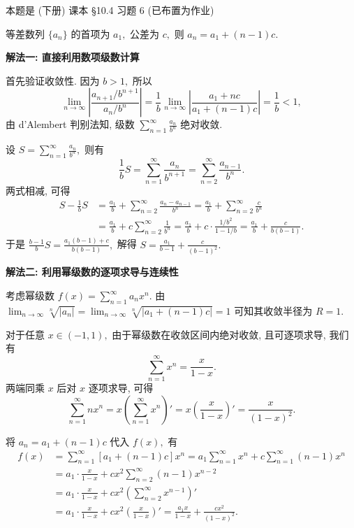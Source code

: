 \begin{solution}
本题是 (下册) 课本 \S 10.4 习题 6 (已布置为作业)

等差数列 $\{ a_n \}$ 的首项为 $a_1,$ 公差为 $c,$ 则 $a_n = a_1 + (n-1)c.$

\textbf{解法一: 直接利用数项级数计算}

首先验证收敛性. 因为 $b > 1,$ 所以
\begin{equation*}
\lim_{n \to \infty} \left| \frac{a_{n+1}/b^{n+1}}{a_n/b^n} \right| = \frac{1}{b} \lim_{n \to \infty} \left| \frac{a_1 + nc}{a_1 + (n-1)c} \right| = \frac{1}{b} < 1,
\end{equation*}
由 d'Alembert 判别法知, 级数 $\displaystyle \sum_{n=1}^\infty \frac{a_n}{b^n}$ 绝对收敛.

设 $\displaystyle S = \sum_{n=1}^\infty \frac{a_n}{b^n},$ 则有
\begin{equation*}
\frac{1}{b} S = \sum_{n=1}^\infty \frac{a_n}{b^{n+1}} = \sum_{n=2}^\infty \frac{a_{n-1}}{b^n}.
\end{equation*}
两式相减, 可得
\begin{align*}
S - \frac{1}{b} S & = \frac{a_1}{b} + \sum_{n=2}^\infty \frac{a_n - a_{n-1}}{b^n} = \frac{a_1}{b} + \sum_{n=2}^\infty \frac{c}{b^n} \\
& = \frac{a_1}{b} + c \sum_{n=2}^\infty \frac{1}{b^n} = \frac{a_1}{b} + c \cdot \frac{1/b^2}{1 - 1/b} = \frac{a_1}{b} + \frac{c}{b(b-1)}.
\end{align*}
于是 $\displaystyle \frac{b-1}{b} S = \frac{a_1(b-1) + c}{b(b-1)},$ 解得 $\displaystyle S = \frac{a_1}{b-1} + \frac{c}{(b-1)^2}.$

\textbf{解法二: 利用幂级数的逐项求导与连续性}

考虑幂级数 $\displaystyle f(x) = \sum_{n=1}^\infty a_n x^n.$ 由 $\lim_{n \to \infty} \sqrt[n]{|a_n|} = \lim_{n \to \infty} \sqrt[n]{|a_1 + (n-1)c|} = 1$ 可知其收敛半径为 $R = 1.$

对于任意 $x \in (-1, 1),$ 由于幂级数在收敛区间内绝对收敛, 且可逐项求导, 我们有
\begin{equation*}
\sum_{n=1}^\infty x^n = \frac{x}{1-x}.
\end{equation*}
两端同乘 $x$ 后对 $x$ 逐项求导, 可得
\begin{equation*}
\sum_{n=1}^\infty n x^n = x \left( \sum_{n=1}^\infty x^n \right)' = x \left( \frac{x}{1-x} \right)' = \frac{x}{(1-x)^2}.
\end{equation*}

将 $a_n = a_1 + (n-1)c$ 代入 $f(x),$ 有
\begin{align*}
f(x) & = \sum_{n=1}^\infty [a_1 + (n-1)c] x^n = a_1 \sum_{n=1}^\infty x^n + c \sum_{n=1}^\infty (n-1) x^n \\
& = a_1 \cdot \frac{x}{1-x} + c x^2 \sum_{n=2}^\infty (n-1) x^{n-2} \\
& = a_1 \cdot \frac{x}{1-x} + c x^2 \left( \sum_{n=2}^\infty x^{n-1} \right)' \\
& = a_1 \cdot \frac{x}{1-x} + c x^2 \left( \frac{x}{1-x} \right)' = \frac{a_1 x}{1-x} + \frac{c x^2}{(1-x)^2}.
\end{align*}


\end{solution}
